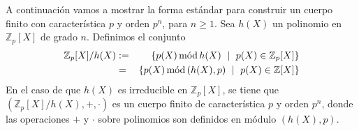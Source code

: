 

A continuación vamos a mostrar la forma estándar para construir un
cuerpo finito con característica $p$ y orden $p^n$, para $n \geq 1$.
Sea $h(X)$ un polinomio en $\mathbb{Z}_p[X]$ de grado $n$. Definimos
el conjunto
\begin{eqnarray*}
\mathbb{Z}_p[X]/h(X) & := & \{p(X) \mods h(X) \ \mid \ p(X)\in \mathbb{Z}_p[X]\}\\
&=& \{p(X) \mods (h(X),p) \ \mid \ p(X)\in \mathbb{Z}[X]\}
\end{eqnarray*}
En el caso de que $h(X)$ es irreducible en $\mathbb{Z}_p[X]$, se tiene
que $(\mathbb{Z}_p[X]/h(X), +, \cdot)$ es un cuerpo finito de
característica $p$ y orden $p^n$, donde las operaciones $+$ y $\cdot$
sobre polinomios son definidos en módulo $(h(X),p)$.
